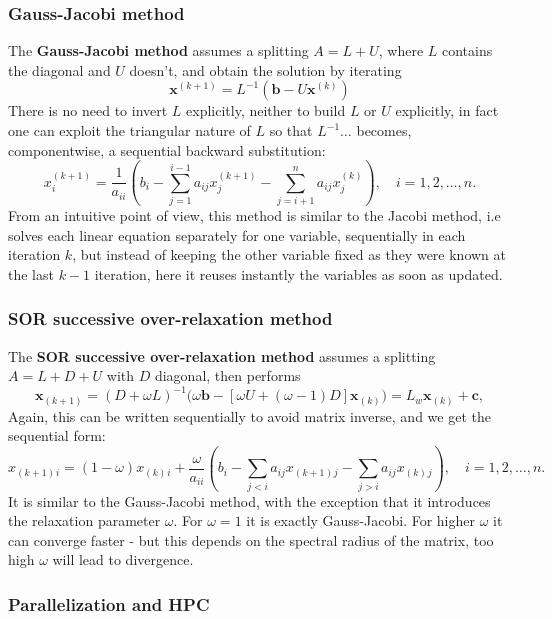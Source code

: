 \documentclass{digitaldynamics}
\def\vect#1{\bm{#1}}
\def\matr#1{{#1}}
\begin{document}
\subsubsection{Gauss-Jacobi method}

The \textbf{Gauss-Jacobi method} assumes a splitting $\matr{A}=\matr{L}+ \matr{U}$, where $L$ contains the diagonal and $U$ doesn't, and obtain the solution by iterating 
\[
\vect{x}^{(k+1)} = L^{-1} (\vect{b} - U \vect{x}^{(k)})
\]
There is no need to invert $L$ explicitly, neither to build $L$ or $U$ explicitly, in fact one can exploit the triangular nature of $L$ so that $L^{-1}\ldots$ becomes, componentwise, a sequential backward substitution:
\[
x^{(k+1)}_i  = \frac{1}{a_{ii}} \left(b_i - \sum_{j=1}^{i-1}a_{ij}x^{(k+1)}_j - \sum_{j=i+1}^{n}a_{ij}x^{(k)}_j \right),\quad i=1,2,\dots,n.
\]
From an intuitive point of view, this method is similar to the Jacobi method, i.e solves each linear equation separately for one variable, sequentially in each iteration $k$, but instead of keeping the other variable fixed as they were known at the last $k-1$ iteration, here it reuses instantly the variables as soon as updated.

\subsubsection{SOR successive over-relaxation method}

The \textbf{SOR successive over-relaxation method} assumes a splitting $\matr{A}=\matr{L}+ \matr{D} + \matr{U}$ with $\matr{D}$ diagonal, then performs 
\[
\mathbf{x}_{(k+1)} = (D+\omega L)^{-1} \big(\omega \mathbf{b} - [\omega U + (\omega-1) D ] \mathbf{x}_{(k)}\big)=L_w \mathbf{x}_{(k)}+\mathbf{c},
\]
Again, this can be written sequentially to avoid matrix inverse, and we get the sequential form:
\[
x_{(k+1)}{}_i  = (1-\omega)x_{(k)}{}_i + \frac{\omega}{a_{ii}} \left(b_i - \sum_{j<i} a_{ij}x_{(k+1)}{}_j - \sum_{j>i} a_{ij}x_{(k)}{}_j \right),\quad i=1,2,\ldots,n. 
\]
It is similar to the Gauss-Jacobi method, with the exception that it introduces the relaxation parameter $\omega$. For $\omega=1$ it is exactly Gauss-Jacobi. For higher $\omega$ it can converge faster - but this depends on the spectral radius of the matrix, too high $\omega$ will lead to divergence.


\subsubsection{Parallelization and HPC}
\end{document}
